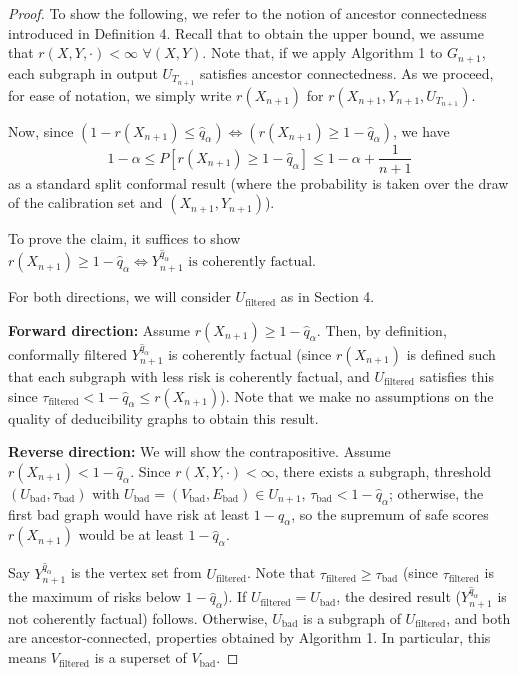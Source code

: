 \documentclass{uai2026} %
\theoremstyle{remark}
\theoremstyle{plain}
\theoremstyle{definition}
\begin{document}
\begin{proof}
To show the following, we refer to the notion of ancestor connectedness introduced in Definition 4. Recall that to obtain the upper bound, we assume that $r(X,Y,\cdot) < \infty$ $\forall(X,Y)$. Note that, if we apply Algorithm 1 to $G_{n+1}$, each subgraph in output $U_{T_{n+1}}$ satisfies ancestor connectedness. As we proceed, for ease of notation, we simply write $r(X_{n+1})$ for $r(X_{n+1},Y_{n+1},U_{T_{n+1}})$.

Now, since $(1-r(X_{n+1}) \leq \hat{q}_\alpha) \Leftrightarrow (r(X_{n+1}) \geq 1-\hat{q}_\alpha)$, we have
$$1-\alpha \leq P[r(X_{n+1}) \geq 1-\hat{q}_\alpha] \leq 1-\alpha + \frac{1}{n+1}$$
as a standard split conformal result (where the probability is taken over the draw of the calibration set and $(X_{n+1},Y_{n+1})$).

To prove the claim, it suffices to show $r(X_{n+1}) \geq 1-\hat{q}_\alpha \Leftrightarrow Y^{\hat{q}_\alpha}_{n+1} \text{ is coherently factual}$.

For both directions, we will consider $U_{\text{filtered}}$ as in Section 4.

\textbf{Forward direction:} Assume $r(X_{n+1}) \geq 1-\hat{q}_\alpha$. Then, by definition, conformally filtered $Y^{\hat{q}_\alpha}_{n+1}$ is coherently factual (since $r(X_{n+1})$ is defined such that each subgraph with less risk is coherently factual, and $U_{\text{filtered}}$ satisfies this since $\tau_{\text{filtered}} < 1-\hat{q}_\alpha \leq r(X_{n+1})$). Note that we make no assumptions on the quality of deducibility graphs to obtain this result.

\textbf{Reverse direction:} We will show the contrapositive. Assume $r(X_{n+1}) < 1-\hat{q}_\alpha$. Since $r(X,Y,\cdot) < \infty$, there exists a subgraph, threshold $(U_{\text{bad}}, \tau_{\text{bad}})$ with $U_{\text{bad}} = (V_{\text{bad}}, E_{\text{bad}}) \in U_{n+1}$, $\tau_{\text{bad}} < 1-\hat{q}_\alpha$; otherwise, the first bad graph would have risk at least $1-\hat{q}_\alpha$, so the supremum of safe scores $r(X_{n+1})$ would be at least $1-\hat{q}_\alpha$.

Say $Y^{\hat{q}_\alpha}_{n+1}$ is the vertex set from $U_{\text{filtered}}$. Note that $\tau_{\text{filtered}} \geq \tau_{\text{bad}}$ (since $\tau_{\text{filtered}}$ is the maximum of risks below $1-\hat{q}_\alpha$). If $U_{\text{filtered}} = U_{\text{bad}}$, the desired result ($Y^{\hat{q}_\alpha}_{n+1}$ is not coherently factual) follows. Otherwise, $U_{\text{bad}}$ is a subgraph of $U_{\text{filtered}}$, and both are ancestor-connected, properties obtained by Algorithm 1. In particular, this means $V_{\text{filtered}}$ is a superset of $V_{\text{bad}}$.


\end{proof}
\end{document}
